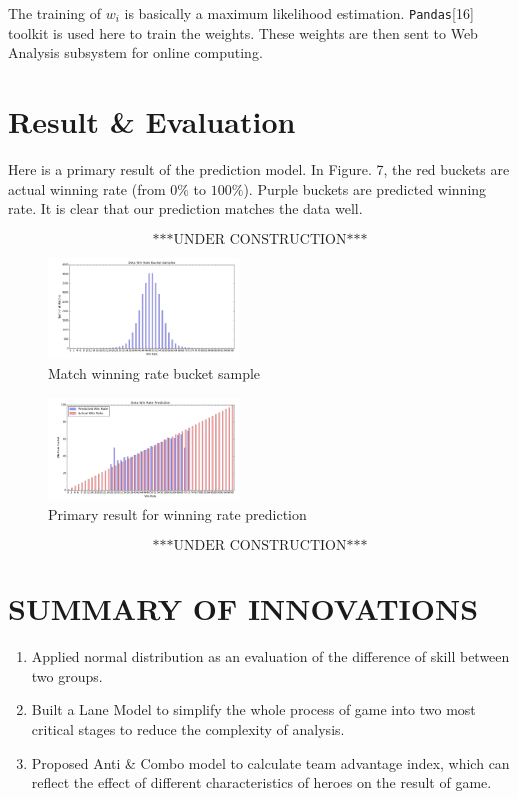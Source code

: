 \documentclass[letterpaper, 10 pt, conference]{ieeeconf}  %
\begin{document}
The training of $w_i$ is basically a maximum likelihood estimation. \texttt{Pandas}[16] toolkit is used here to train the weights. These weights are then sent to Web Analysis subsystem for online computing.

\section{Result \& Evaluation}

Here is a primary result of the prediction model. In Figure. 7, the red buckets are actual winning rate (from $0\%$ to $100\%$). Purple buckets are predicted winning rate. It is clear that our prediction matches the data well.

$$\text{***UNDER CONSTRUCTION***}$$

\begin{figure}[H]
\begin{center}
\includegraphics[width=0.45\textwidth]{result_1.png}
\caption{Match winning rate bucket sample}
\end{center}
\end{figure}

\begin{figure}[H]
\begin{center}
\includegraphics[width=0.45\textwidth]{result_2.png}
\caption{Primary result for winning rate prediction}
\end{center}
\end{figure}

$$\text{***UNDER CONSTRUCTION***}$$

\section{SUMMARY OF INNOVATIONS}
\begin{enumerate}
	\item Applied normal distribution as an evaluation of the difference of skill between two groups.
    \item Built a Lane Model to simplify the whole process of game into two most critical stages to reduce the complexity of analysis.
   	\item Proposed Anti \& Combo model to calculate team advantage index, which can reflect the effect of different characteristics of heroes on the result of game.
\end{enumerate}
\end{document}
